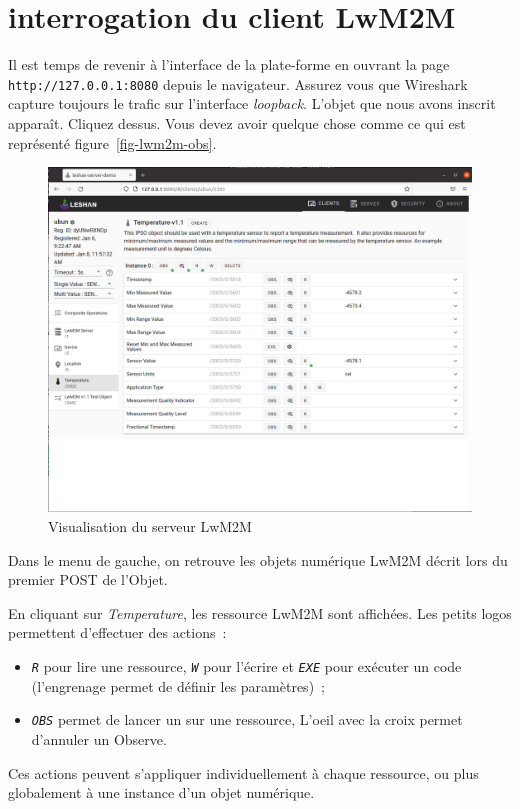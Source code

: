 \section{interrogation du client LwM2M}

Il est temps de revenir à l'interface de la plate-forme en ouvrant la page \texttt{http://127.0.0.1:8080} depuis le navigateur. Assurez vous que Wireshark capture toujours le trafic sur l'interface \textit{loopback}.  L'objet que nous avons inscrit apparaît. Cliquez dessus. Vous devez avoir quelque chose comme ce qui est représenté figure~\vref{fig-lwm2m-obs}.


\begin{figure}[tbp]
\centerline{\includegraphics[width=1\columnwidth]{Pictures/lwm2m-obsever.png}}
\caption{Visualisation du serveur LwM2M}
\label{fig-lwm2m-obs}
\end{figure}

         \vspace{1em}

Dans le menu de gauche, on retrouve les objets numérique LwM2M décrit lors du premier POST de l'Objet.

         \vspace{1em}

En cliquant sur \textit{Temperature}, les ressource LwM2M sont affichées. Les petits logos permettent d'effectuer des actions~:
\begin{itemize}
    \item \texttt{\textit{R}} pour lire une ressource, \texttt{\textit{W}} pour l'écrire et \texttt{\textit{EXE}} pour exécuter un code (l'engrenage permet de définir les paramètres)~;
    \item \texttt{\textit{OBS}} permet de lancer un  sur une ressource, L'oeil avec la croix permet d'annuler un Observe.
\end{itemize}
Ces actions peuvent s'appliquer individuellement à chaque ressource, ou plus globalement à une instance d'un objet numérique.

